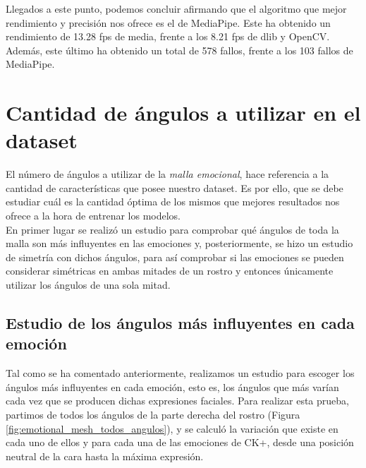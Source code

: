 Llegados a este punto, podemos concluir afirmando que el algoritmo que mejor rendimiento y precisión nos ofrece es el de MediaPipe. Este ha obtenido un rendimiento de 13.28 fps de media, frente a los 8.21 fps de dlib y OpenCV. Además, este último ha obtenido un total de 578 fallos, frente a los 103 fallos de MediaPipe.

\section{Cantidad de ángulos a utilizar en el dataset}
\label{sec:estudio_cantidad_de_angulos}

El número de ángulos a utilizar de la \textit{malla emocional}, hace referencia a la cantidad de características que posee nuestro dataset. Es por ello, que se debe estudiar cuál es la cantidad óptima de los mismos que mejores resultados nos ofrece a la hora de entrenar los modelos.\\

En primer lugar se realizó un estudio para comprobar qué ángulos de toda la malla son más influyentes en las emociones y, posteriormente, se hizo un estudio de simetría con dichos ángulos, para así comprobar si las emociones se pueden considerar simétricas en ambas mitades de un rostro y entonces únicamente utilizar los ángulos de una sola mitad.

\subsection{Estudio de los ángulos más influyentes en cada emoción}

Tal como se ha comentado anteriormente, realizamos un estudio para escoger los ángulos más influyentes en cada emoción, esto es, los ángulos que más varían cada vez que se producen dichas expresiones faciales. Para realizar esta prueba, partimos de todos los ángulos de la parte derecha del rostro (Figura \ref{fig:emotional_mesh_todos_angulos}), y se calculó la variación que existe en cada uno de ellos y para cada una de las emociones de CK+, desde una posición neutral de la cara hasta la máxima expresión.\\

